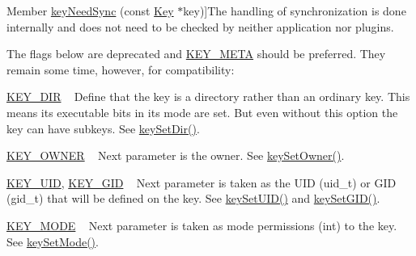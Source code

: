 \begin{DoxyRefList}
%
Member \hyperlink{group__keytest_gaf247df0de7aca04b32ef80e39ef12950}{key\+Need\+Sync} (const \hyperlink{classkdb_1_1Key}{Key} $\ast$key)]The handling of synchronization is done internally and does not need to be checked by neither application nor plugins. 
\item[\label{deprecated__deprecated000010}%
\Hypertarget{deprecated__deprecated000010}%
Member \hyperlink{group__key_gad23c65b44bf48d773759e1f9a4d43b89}{key\+New} (const char $\ast$name,...)]The flags below are deprecated and \hyperlink{group__key_gga91fb3178848bd682000958089abbaf40a040582834bb2d90049947d7ef74e87e2}{K\+E\+Y\+\_\+\+M\+E\+TA} should be preferred. They remain some time, however, for compatibility\+:
\begin{DoxyItemize}
\item \hyperlink{group__key_gga91fb3178848bd682000958089abbaf40a9e43e47c8a21478538e2d20e049981d5}{K\+E\+Y\+\_\+\+D\+IR} ~\newline
 Define that the key is a directory rather than an ordinary key. This means its executable bits in its mode are set. But even without this option the key can have subkeys. See \hyperlink{group__meta_gaae575bd86a628a15ee45baa860522e75}{key\+Set\+Dir()}.
\item \hyperlink{group__key_gga91fb3178848bd682000958089abbaf40a77ca60362fa8daca8d5347db4385068b}{K\+E\+Y\+\_\+\+O\+W\+N\+ER} ~\newline
 Next parameter is the owner. See \hyperlink{owner_8c_a88d6ec200ba0707b7c1b4a88133d2be4}{key\+Set\+Owner()}.
\item \hyperlink{group__key_gga91fb3178848bd682000958089abbaf40a28f01a87d65f065172f734c9c9446c0e}{K\+E\+Y\+\_\+\+U\+ID}, \hyperlink{group__key_gga91fb3178848bd682000958089abbaf40ac0628bbaba7c837ca73323681393d15f}{K\+E\+Y\+\_\+\+G\+ID} ~\newline
 Next parameter is taken as the U\+ID (uid\+\_\+t) or G\+ID (gid\+\_\+t) that will be defined on the key. See \hyperlink{group__meta_gab5f284f5ecd261e0a290095f50ba1af7}{key\+Set\+U\+I\+D()} and \hyperlink{group__meta_ga9e3d0fb3f7ba906e067727b9155d22e3}{key\+Set\+G\+I\+D()}.
\item \hyperlink{group__key_gga91fb3178848bd682000958089abbaf40a1b0a91ff3a855d6993930ebf0abaa518}{K\+E\+Y\+\_\+\+M\+O\+DE} ~\newline
 Next parameter is taken as mode permissions (int) to the key. See \hyperlink{group__meta_ga8803037e35b9da1ce492323a88ff6bc3}{key\+Set\+Mode()}. 
\begin{DoxyCodeInclude}

\end{DoxyCodeInclude}
\end{DoxyItemize}
\end{DoxyRefList}
